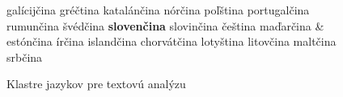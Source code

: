 \begin{multicols}{2}
\begin{figure}[h!]
\begin{tabular}
  galícijčina \newline 
  gréčtina \newline 
  katalánčina \newline 
  nórčina \newline 
  poľština \newline 
  portugalčina \newline 
  rumunčina \newline 
  švédčina \newline 
  \textbf{slovenčina} \newline 
  slovinčina \newline 
  čeština \newline 
  maďarčina \newline 
& \vspace*{0.5mm}estónčina \newline 
  írčina \newline 
  islandčina \newline 
  chorvátčina \newline 
  lotyština \newline 
  litovčina \newline 
  maltčina \newline 
  srbčina \\
  \end{tabular}
\label{fig:text_cluster_sk}
\caption{Klastre jazykov pre textovú analýzu}
\end{figure}


\end{multicols}
